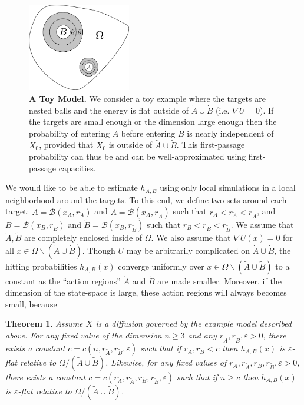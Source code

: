 \documentclass[12pt, nofootinbib,english, amsmath, amssymb, aps, priprint, graphicx,floatfix]{revtex4-1}
\newtheorem{theorem}{Theorem}
\theoremstyle{plain}
\theoremstyle{definition}
\theoremstyle{plain}
\newcommand{\bb}[1]{\mathcal{B}\left(#1\right)}
\newcommand{\dA}{{\dot A}}
\newcommand{\tA}{{\tilde A}}
\newcommand{\dB}{{\dot B}}
\newcommand{\tB}{{\tilde B}}
\begin{document}
\begin{figure}
    \centering  \includegraphics[width=0.4\textwidth]{ToyModel4.png}
    \caption{\footnotesize\linespread{1.}\selectfont{} {\bf A Toy Model.} We consider a toy example where the targets are nested balls and the energy is flat outside of $\dA\cup\dB$ (i.e. $\nabla U=0$). If the targets are small enough or the dimension large enough then the probability of entering $A$ before entering $B$ is nearly independent of $X_0$, provided that $X_0$ is outside of $\tA\cup\tB$. This first-passage probability can thus be and can be well-approximated using first-passage capacities.}
\label{fig:ToyModel}
\end{figure}
We would like to be able to estimate $h_{A,B}$ using only local simulations in a local neighborhood around the targets.  To this end, we define two sets around each target: $\dA=\bb{x_A,r_\dA }$ and $\tA=\bb{x_A,r_\tA }$ such that $r_A<r_\dA<r_\tA$, and
$\dB=\bb{x_B,r_\dB }$ and $\tB=\bb{x_B,r_\tB }$ such that $r_B<r_\dB<r_\tB$.  We assume that $\tA,\tB$ are completely enclosed inside of $\Omega$.  We also assume that $\nabla U(x)=0$ for all $x\in\Omega\backslash (\dA\cup\dB)$.  
Though $U$ may be arbitrarily complicated on $\dA \cup \dB$, the hitting probabilities $h_{A,B}(x)$ converge uniformly over $x\in \Omega \backslash (\tA\cup \tB)$ to a constant as the ``action regions'' $\dA$ and $\dB$ are made smaller.  Moreover, if the dimension of the state-space is large, these action regions will always becomes small, because 

\begin{theorem}\label{thm:epsilon_flat}
Assume $X$ is a diffusion governed by the example model described above.  For any fixed value of the dimension $n \geq 3$ and any $r_{\tilde{A}}, r_{\tilde{B}}, \varepsilon > 0$, there exists a constant $c=c(n, r_{\tilde{A}}, r_{\tilde{B}}, \varepsilon)$ such that if $r_{\dA}, r_{\dB} < c$ then 
$h_{A,B}(x)$ is 
$\varepsilon$-flat  relative to 
$\Omega / (\tilde{A} \cup \tilde{B})$.  
Likewise, for any fixed values of $r_{\dA}, r_{\tilde{A}}, r_{\dB}, r_{\tilde{B}}, \varepsilon>0$, there exists a constant $c=c(r_\dA, r_{\tilde{A}}, r_\dB, r_{\tilde{B}}, \varepsilon)$ such that if $n \geq c$ then 
$h_{A,B}(x)$ is
$\varepsilon$-flat relative to 
$\Omega / (\tilde{A} \cup \tilde{B})$. 
\end{theorem}
\end{document}
